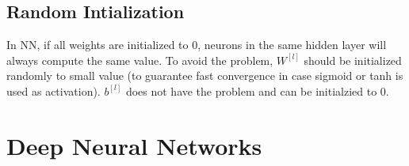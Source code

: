 \subsection{Random Intialization}
In NN, if all weights are initialized to 0, neurons in the same hidden layer will always compute the same value. To avoid the problem, $W^{[l]}$ should be initialized randomly to small value (to guarantee fast convergence in case sigmoid or tanh is used as activation). $b^{[l]}$ does not have the problem and can be initialzied to 0.

\section{Deep Neural Networks}

\ifx\PREAMBLE\undefined

\fi